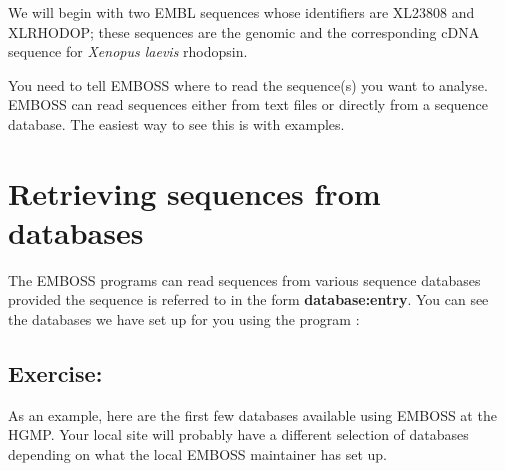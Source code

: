 \documentclass[12pt]{report}
\begin{document}
We will	begin with two EMBL sequences whose identifiers	are XL23808
and XLRHODOP; these sequences are the genomic and the corresponding
cDNA sequence for {\em Xenopus laevis} rhodopsin.

You need to tell EMBOSS	where to read the sequence(s) you want to
analyse. EMBOSS	can read sequences either from text files or directly
from a sequence	database. The easiest way to see this is with examples.

\section{Retrieving sequences from databases}
The EMBOSS programs can	read sequences from various sequence databases
provided the sequence is referred to in	the form {\bf
database:entry}. You can see the databases we have set up for you using	the program
:

\subsection*{Exercise: }

As an example, here are	the first few databases	available using	EMBOSS
at the HGMP. Your local	site will probably have	a different selection
of databases depending on what the local EMBOSS	maintainer has set up.

\unix{}\\
\end{document}
